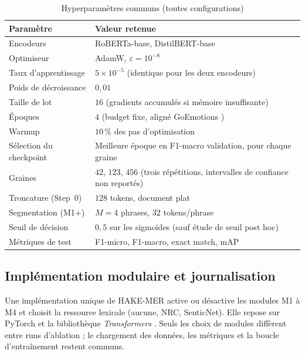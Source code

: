 \begin{table}[H]
\centering
\caption{Hyperparamètres communs (toutes configurations)}
\label{tab:expe-hyperparams}
\renewcommand{\arraystretch}{1.2}
\begin{tabular}{|p{4.2cm}|p{8.8cm}|}
\hline
\textbf{Paramètre} & \textbf{Valeur retenue} \\
\hline
Encodeurs & RoBERTa-base, DistilBERT-base \cite{liu2019roberta,sanh2019distilbert} \\
\hline
Optimiseur & AdamW, $\varepsilon=10^{-8}$ \\
\hline
Taux d'apprentissage & $5 \times 10^{-5}$ (identique pour les deux encodeurs) \\
\hline
Poids de décroissance & $0{,}01$ \\
\hline
Taille de lot & $16$ (gradients accumulés si mémoire insuffisante) \\
\hline
Époques & $4$ (budget fixe, aligné GoEmotions \cite{demszky2020}) \\
\hline
Warmup & $10\,\%$ des pas d'optimisation \\
\hline
Sélection du checkpoint & Meilleure époque en F1-macro validation, pour chaque graine \\
\hline
Graines & $42$, $123$, $456$ (trois répétitions, intervalles de confiance non reportés) \\
\hline
Troncature (Step~0) & $128$ tokens, document plat \\
\hline
Segmentation (M1+) & $M{=}4$ phrases, $32$ tokens/phrase \\
\hline
Seuil de décision & $0{,}5$ sur les sigmoïdes (sauf étude de seuil post hoc) \\
\hline
Métriques de test & F1-micro, F1-macro, exact match, mAP
\cite{wu2021multilabelranking,bond2022multilabel} \\
\hline
\end{tabular}
\end{table}

\subsection{Implémentation modulaire et journalisation}
\label{sec:expe-impl-flags}

Une implémentation unique de HAKE-MER active ou désactive les modules
M1 à M4 et choisit la ressource lexicale (aucune, NRC, SenticNet).
Elle repose sur PyTorch \cite{paszke2019pytorch} et la bibliothèque
\emph{Transformers} \cite{wolf2020}. Seuls les choix de modules
diffèrent entre runs d'ablation ; le chargement des données, les
métriques et la boucle d'entraînement restent communs.

